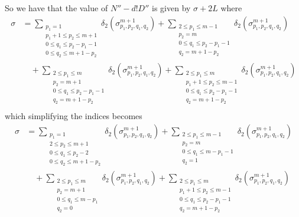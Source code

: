 \documentclass[11pt]{article}
\theoremstyle{definition}
\theoremstyle{definition}
\theoremstyle{plain}
\theoremstyle{plain}
\theoremstyle{plain}
\theoremstyle{definition}
\begin{document}
So we have that the value of $N''-d!D''$ is given by $\sigma + 2L$ where
\begin{align*}
\sigma &= \sum\limits_{\substack{p_1=1 \\ p_1+1\leq p_2 \leq m+1 \\ 0\leq q_1\leq p_2-p_1-1 \\ 0\leq q_2 \leq m+1-p_2}}\delta_2\left(\sigma^{m+1}_{p_1,p_2,q_1,q_2}\right) + \sum\limits_{\substack{2\leq p_1\leq m-1 \\ p_2 = m \\ 0\leq q_1\leq p_2-p_1-1 \\ q_2 = m+1-p_2}}\delta_2\left(\sigma^{m+1}_{p_1,p_2,q_1,q_2}\right) \\
&\quad+ \sum\limits_{\substack{2\leq p_1\leq m \\ p_2 = m+1\\ 0\leq q_1\leq p_2-p_1-1 \\ q_2=m+1-p_2}}\delta_2\left(\sigma^{m+1}_{p_1,p_2,q_1,q_2}\right) + \sum\limits_{\substack{2\leq p_1\leq m \\ p_1+1\leq p_2 \leq m-1 \\ 0\leq q_1\leq p_2-p_1-1 \\ q_2 = m+1-p_2}}\delta_2\left(\sigma^{m+1}_{p_1,p_2,q_1,q_2}\right) \\
\end{align*}
which simplifying the indices becomes
\begin{align*}
\sigma &= \sum\limits_{\substack{p_1=1 \\ 2\leq p_2 \leq m+1 \\ 0\leq q_1\leq p_2-2 \\ 0\leq q_2 \leq m+1-p_2}}\delta_2\left(\sigma^{m+1}_{p_1,p_2,q_1,q_2}\right) + \sum\limits_{\substack{2\leq p_1\leq m-1 \\ p_2 = m \\ 0\leq q_1\leq m-p_1-1 \\ q_2 = 1}}\delta_2\left(\sigma^{m+1}_{p_1,p_2,q_1,q_2}\right) \\
&\quad+ \sum\limits_{\substack{2\leq p_1\leq m \\ p_2 = m+1\\ 0\leq q_1\leq m-p_1 \\ q_2=0}}\delta_2\left(\sigma^{m+1}_{p_1,p_2,q_1,q_2}\right) + \sum\limits_{\substack{2\leq p_1\leq m \\ p_1+1\leq p_2 \leq m-1 \\ 0\leq q_1\leq p_2-p_1-1 \\ q_2 = m+1-p_2}}\delta_2\left(\sigma^{m+1}_{p_1,p_2,q_1,q_2}\right) \\
\end{align*}
\end{document}

